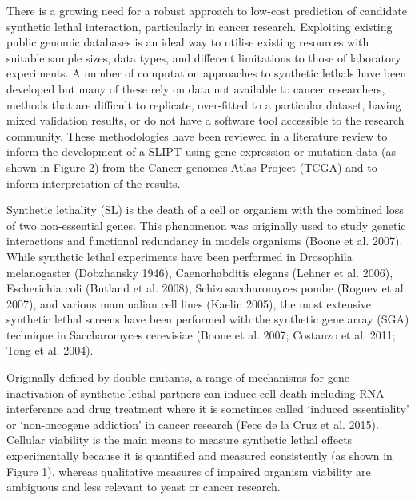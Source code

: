 There is a growing need for a robust approach to low-cost prediction of candidate \gls{synthetic lethal} interaction, particularly in cancer research.  Exploiting existing public \gls{genomic} databases is an ideal way to utilise existing resources with suitable sample sizes, data types, and different limitations to those of laboratory experiments.  A number of computation approaches to \glspl{synthetic lethal} have been developed but many of these rely on data not available to cancer researchers, methods that are difficult to replicate, over-fitted to a particular dataset, having mixed validation results, or do not have a software tool accessible to the research community.  These methodologies have been reviewed in a literature review to inform the development of a \gls{SLIPT} using \gls{gene expression} or \gls{mutation} data (as shown in Figure 2) from the Cancer \Glspl{genome} Atlas Project (\gls{TCGA}) and to inform interpretation of the results.  

Synthetic lethality (SL) is the death of a cell or organism with the combined loss of two non-\gls{essential} genes.   This phenomenon was originally used to study genetic interactions and \gls{functional redundancy} in models organisms (Boone et al. 2007).   While \gls{synthetic lethal} experiments have been performed in Drosophila melanogaster (Dobzhansky 1946), Caenorhabditis elegans (Lehner et al. 2006), Escherichia coli (Butland et al. 2008), Schizosaccharomyces pombe (Roguev et al. 2007), and various mammalian cell lines (Kaelin 2005), the most extensive \gls{synthetic lethal} screens have been performed with the synthetic gene array (\gls{SGA}) technique in Saccharomyces cerevisiae (Boone et al. 2007; Costanzo et al. 2011; Tong et al. 2004).  

Originally defined by double \glspl{mutant}, a range of mechanisms for gene inactivation of \gls{synthetic lethal} partners can induce cell death including \acrshort{RNA} interference and drug treatment where it is sometimes called ‘\gls{induced essentiality}’ or ‘\gls{non-oncogene addiction}’ in cancer research (Fece de la Cruz et al. 2015).  Cellular viability is the main means to measure \gls{synthetic lethal} effects experimentally because it is quantified and measured consistently (as shown in Figure 1), whereas qualitative measures of impaired organism viability are ambiguous and less relevant to yeast or cancer research.

